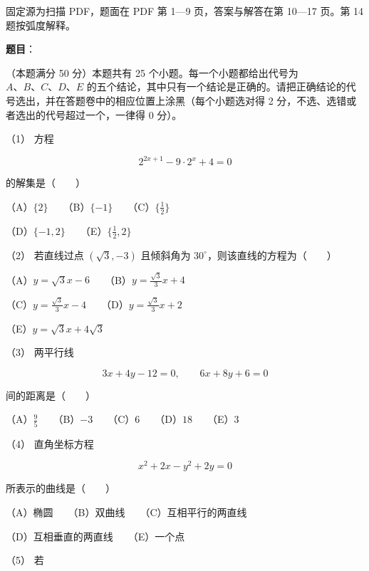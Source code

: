 

\begin{gktip}
固定源为扫描 PDF，题面在 PDF 第 1—9 页，答案与解答在第 10—17 页。第 14 题按弧度解释。
\end{gktip}

\begin{answer}

\textbf{题目}：

（本题满分 50 分）本题共有 25 个小题。每一个小题都给出代号为 $A\text{、}B\text{、}C\text{、}D\text{、}E$ 的五个结论，其中只有一个结论是正确的。请把正确结论的代号选出，并在答题卷中的相应位置上涂黑（每个小题选对得 2 分，不选、选错或者选出的代号超过一个，一律得 0 分）。

（1） 方程

\nopagebreak[4]
\[
2^{2x+1}-9\cdot2^x+4=0
\]

的解集是\mbox{（　　）}

（A）$\{2\}$　　（B）$\{-1\}$　　（C）$\{\frac12\}$

（D）$\{-1,2\}$　　（E）$\{\frac12,2\}$

（2） 若直线过点 $(\sqrt3,-3)$ 且倾斜角为 $30^\circ$，则该直线的方程为\mbox{（　　）}

（A）$y=\sqrt3x-6$　　（B）$y=\frac{\sqrt3}{3}x+4$

（C）$y=\frac{\sqrt3}{3}x-4$　　（D）$y=\frac{\sqrt3}{3}x+2$

（E）$y=\sqrt3x+4\sqrt3$

（3） 两平行线

\nopagebreak[4]
\[
3x+4y-12=0,\qquad 6x+8y+6=0
\]

间的距离是\mbox{（　　）}

（A）$\frac95$　　（B）$-3$　　（C）$6$　　（D）$18$　　（E）$3$

（4） 直角坐标方程

\nopagebreak[4]
\[
x^2+2x-y^2+2y=0
\]

所表示的曲线是\mbox{（　　）}

（A）椭圆　　（B）双曲线　　（C）互相平行的两直线

（D）互相垂直的两直线　　（E）一个点

（5） 若


\end{answer}
